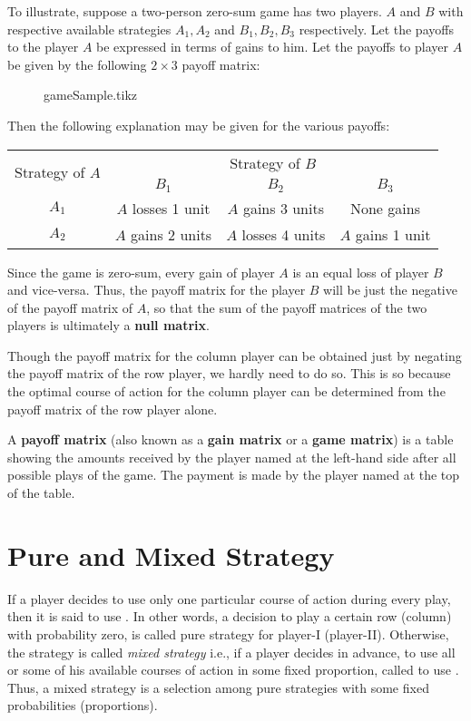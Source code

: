 \documentclass[../main-sheet.tex]{subfiles}
\begin{document}
To illustrate, suppose a two-person zero-sum game has two players. \(A\) and \(B\) with respective available strategies \(A_1,A_2\) and \(B_1,B_2,B_3\) respectively. Let the payoffs to the player \(A\) be expressed in terms of gains to him. Let the payoffs to player \(A\) be given by the following \(2\times 3\) payoff matrix:
\begin{figure}[H]
    \centering
    {gameSample.tikz}
\end{figure}
Then the following explanation may be given for the various payoffs:
\begin{table}[H]
    \centering
    \begin{tabular}{cccc}
        \toprule
        \multicolumn{1}{c}{\multirow{2}{*}{Strategy of \(A\)}} & \multicolumn{3}{c}{Strategy of \(B\)} \\
        \multicolumn{1}{c}{} & \(B_1\) & \(B_2\) & \(B_3\) \\ \midrule
        \(A_1\) & \(A\) losses 1 unit & \(A\) gains 3 units & None gains \\
        \(A_2\) & \(A\) gains 2 units & \(A\) losses 4 units & \(A\) gains 1 unit \\ \bottomrule
        \end{tabular}
\end{table}
Since the game is zero-sum, every gain of player \(A\) is an equal loss of player \(B\) and vice-versa. Thus, the payoff matrix for the player \(B\) will be just the negative of the payoff matrix of \(A\), so that the sum of the payoff matrices of the two players is ultimately a \textbf{null matrix}.
\begin{rem}
    Though the payoff matrix for the column player can be obtained just by negating the payoff matrix of the row player, we hardly need to do so. This is so because the optimal course of action for the column player can be determined from the payoff matrix of the row player alone.
\end{rem}
 A \textbf{payoff matrix} (also known as a \textbf{gain matrix} or a \textbf{game matrix}) is a table showing the amounts received by the player named at the left-hand side after all possible plays of the game. The payment is made by the player named at the top of the table.
\section{Pure and Mixed Strategy}
If a player decides to use only one particular course of action during every play, then it is said to use . In other words, a decision to play a certain row (column) with probability zero, is called pure strategy for player-I (player-II). Otherwise, the strategy is called \emph{mixed strategy} i.e., if a player decides in advance, to use all or some of his available courses of action in some fixed proportion, called to use . Thus, a mixed strategy is a selection among pure strategies with some fixed probabilities (proportions).\\
\end{document}

